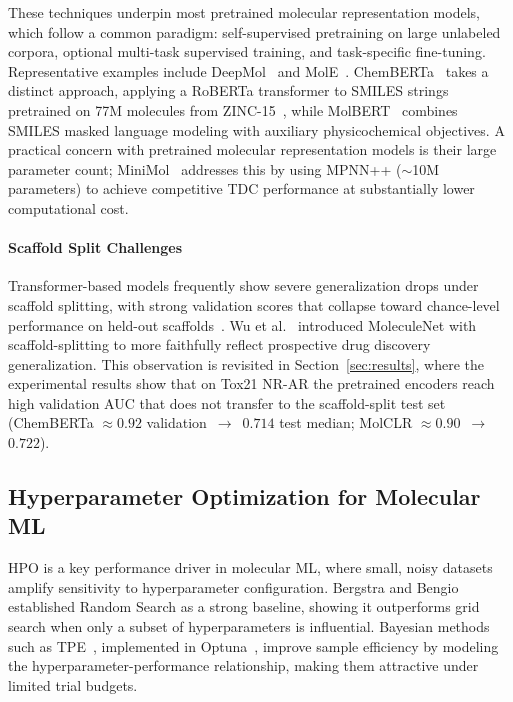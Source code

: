 \documentclass[journal]{IEEEtran}
\begin{document}
These techniques underpin most pretrained molecular representation models, which follow a common paradigm: self-supervised pretraining on large unlabeled corpora, optional multi-task supervised training, and task-specific fine-tuning. Representative examples include DeepMol~\cite{deepMol} and MolE~\cite{molE}. ChemBERTa~\cite{chemberta2} takes a distinct approach, applying a RoBERTa transformer to SMILES strings pretrained on 77M molecules from ZINC-15~\cite{sterling2015zinc15}, while MolBERT~\cite{molbert} combines SMILES masked language modeling with auxiliary physicochemical objectives. A practical concern with pretrained molecular representation models is their large parameter count; MiniMol~\cite{miniMol} addresses this by using MPNN++ ($\sim$10M parameters) to achieve competitive TDC performance at substantially lower computational cost.

\paragraph{Scaffold Split Challenges}
Transformer-based models frequently show severe generalization drops under scaffold splitting, with strong validation scores that collapse toward chance-level performance on held-out scaffolds~\cite{yang2019dmpnn,chemberta2}. Wu et al.~\cite{wu2018moleculenet} introduced MoleculeNet with scaffold-splitting to more faithfully reflect prospective drug discovery generalization. This observation is revisited in Section~\ref{sec:results}, where the experimental results show that on Tox21 NR-AR the pretrained encoders reach high validation AUC that does not transfer to the scaffold-split test set (ChemBERTa $\approx0.92$ validation~$\to$~$0.714$ test median; MolCLR $\approx0.90$~$\to$~$0.722$).


\subsection{Hyperparameter Optimization for Molecular ML}

HPO is a key performance driver in molecular ML, where small, noisy datasets amplify sensitivity to hyperparameter configuration. Bergstra and Bengio~\cite{bergstra2012random} established Random Search as a strong baseline, showing it outperforms grid search when only a subset of hyperparameters is influential. Bayesian methods such as TPE~\cite{bergstra2011tpe}, implemented in Optuna~\cite{akiba2019optuna}, improve sample efficiency by modeling the hyperparameter-performance relationship, making them attractive under limited trial budgets.
\end{document}
